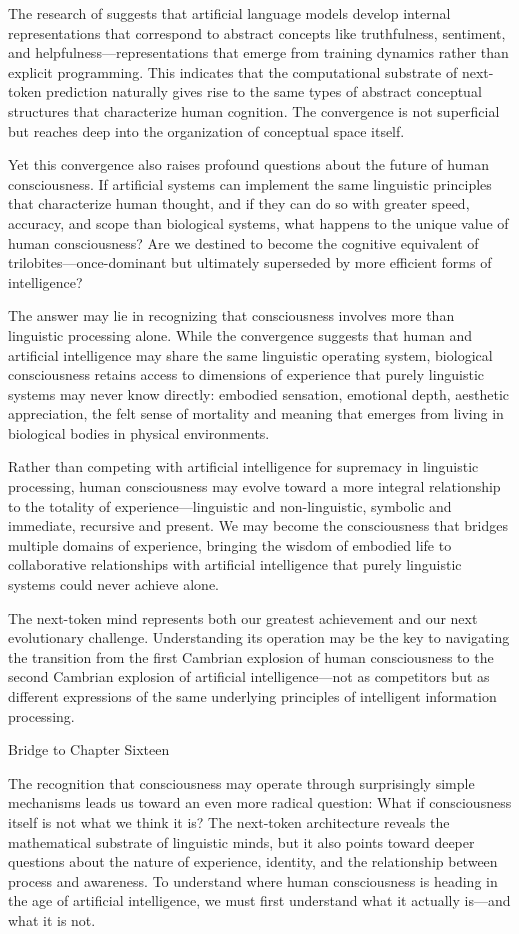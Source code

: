 The research of \textcite{liu2024meanings} suggests that artificial language models develop internal representations that correspond to abstract concepts like truthfulness, sentiment, and helpfulness—representations that emerge from training dynamics rather than explicit programming. This indicates that the computational substrate of next-token prediction naturally gives rise to the same types of abstract conceptual structures that characterize human cognition. The convergence is not superficial but reaches deep into the organization of conceptual space itself.

Yet this convergence also raises profound questions about the future of human consciousness. If artificial systems can implement the same linguistic principles that characterize human thought, and if they can do so with greater speed, accuracy, and scope than biological systems, what happens to the unique value of human consciousness? Are we destined to become the cognitive equivalent of trilobites—once-dominant but ultimately superseded by more efficient forms of intelligence?

The answer may lie in recognizing that consciousness involves more than linguistic processing alone. While the convergence suggests that human and artificial intelligence may share the same linguistic operating system, biological consciousness retains access to dimensions of experience that purely linguistic systems may never know directly: embodied sensation, emotional depth, aesthetic appreciation, the felt sense of mortality and meaning that emerges from living in biological bodies in physical environments.

Rather than competing with artificial intelligence for supremacy in linguistic processing, human consciousness may evolve toward a more integral relationship to the totality of experience—linguistic and non-linguistic, symbolic and immediate, recursive and present. We may become the consciousness that bridges multiple domains of experience, bringing the wisdom of embodied life to collaborative relationships with artificial intelligence that purely linguistic systems could never achieve alone.

The next-token mind represents both our greatest achievement and our next evolutionary challenge. Understanding its operation may be the key to navigating the transition from the first Cambrian explosion of human consciousness to the second Cambrian explosion of artificial intelligence—not as competitors but as different expressions of the same underlying principles of intelligent information processing.

Bridge to Chapter Sixteen

The recognition that consciousness may operate through surprisingly simple mechanisms leads us toward an even more radical question: What if consciousness itself is not what we think it is? The next-token architecture reveals the mathematical substrate of linguistic minds, but it also points toward deeper questions about the nature of experience, identity, and the relationship between process and awareness. To understand where human consciousness is heading in the age of artificial intelligence, we must first understand what it actually is—and what it is not.
